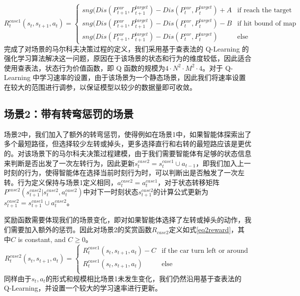 \documentclass{standalone}
\begin{document}
    \begin{equation}
    \label{rewardcase1}
    R_t^{case1}(s_t, s_{t+1}, a_t) = \begin{cases}
     sng(Dis(P_{t+1}^{car}, P_{t+1}^{target}) - Dis(P_{t}^{car}, P_{t}^{target}) + A &\mbox{if reach the target}\\
     sng(Dis(P_{t+1}^{car}, P_{t+1}^{target}) - Dis(P_{t}^{car}, P_{t}^{target}) - B &\mbox{if hit bound of map}\\
     sng(Dis(P_{t+1}^{car}, P_{t+1}^{target}) - Dis(P_{t}^{car}, P_{t}^{target}) &\mbox{else}
     \end{cases}
    \end{equation}
完成了对场景的马尔科夫决策过程的定义，我们采用基于查表法的 Q-Learning 的强化学习算法解决这一问题，原因在于该场景的状态和行为的维度较低，因此适合使用查表法，状态行为价值函数，即 Q 函数的规模为$4\cdot N^2\cdot M^2 \cdot 4$。对于 Q-Learning 中学习速率的设置，由于该场景为一个静态场景，因此我们将速率设置在较大的范围进行调参，以保证模型以较少的数据量即可收敛。
\subsection{场景2：带有转弯惩罚的场景}
场景2中，我们加入了额外的转弯惩罚，使得例如在场景1中，如果智能体探索出了多个最短路径，但选择较少左转或掉头，更多选择直行和右转的最短路应该是更优的。对该场景下的马尔科夫决策过程建模，由于我们需要智能体有足够的状态信息来判断是否出发了一次左转行为，因此更新$s_t^{case2}=s_t^{case1}\cup a_{t-1}$，即我们加入上一时刻的行为，使得智能体在选择当前时刻行为时，可以判断出是否触发了一次左转。行为定义保持与场景1定义相同，$a_t^{case2} = a_t^{case1}$，对于状态转移矩阵$P^{case2}(s_{t+1}^{case2}|s_t^{case2}, a_t^{case2})$中对下一时刻状态$s_{t+1}^{case2}$的计算公式更新为$s_{t+1}^{case2} = s_{t+1}^{case1} \cup a_t^{case2}$。\par
奖励函数需要体现我们的场景变化，即对如果智能体选择了左转或掉头的动作，我们需要加入额外的惩罚。因此对场景2的奖赏函数$R_{case2}$定义如式\ref{eq2reward}，其中$C$ is constant, and $C \geq 0$。
    \begin{equation}
    \label{eq2reward}
    R_t^{case2}(s_t, s_{t+1}, a_t) = \begin{cases}
     R_t^{case1}(s_t, s_{t+1}, a_t) - C &\mbox{if the car turn left or around}\\
     R_t^{case1}(s_t, s_{t+1}, a_t) &\mbox{else}\\
     \end{cases}
    \end{equation}
   \mbox{}
同样由于$s_t, a_t$的形式和规模相比场景1未发生变化，我们仍然沿用基于查表法的 Q-Learning，并设置一个较大的学习速率进行更新。
\end{document}

